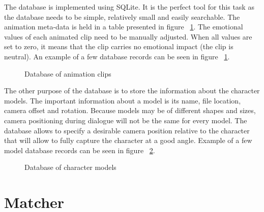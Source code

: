 The database is implemented using SQLite. It is the perfect tool for this task as the database needs to be simple, relatively small and easily searchable. The animation meta-data is held in a table presented in figure ~\ref{fig:db}. The emotional values of each animated clip need to be manually adjusted. When all values are set to zero, it means that the clip carries no emotional impact (the clip is neutral). An example of a few database records can be seen in figure ~\ref{fig:db}.

\begin{figure}[H]
\centerline{}
\caption{Database of animation clips}\label{fig:db}
\end{figure}

The other purpose of the database is to store the information about the character models. The important information about a model is its name, file location, camera offset and rotation. Because models may be of different shapes and sizes, camera positioning during dialogue will not be the same for every model. The database allows to specify a desirable camera position relative to the character that will allow to fully capture the character at a good angle. Example of a few model database records can be seen in figure ~\ref{fig:dbmodel}.

\begin{figure}[H]
\centerline{}
\caption{Database of character models}\label{fig:dbmodel}
\end{figure}


\section{Matcher}

